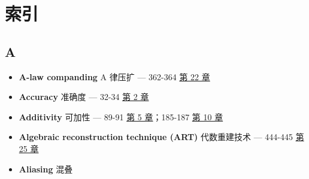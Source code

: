 
\chapter{索引}\label{ch-35}

\section{A}

\begin{itemize}
\tightlist
\item
  \textbf{A-law companding} A 律压扩 --- 362-364 
  \hyperref[ch-22]{第 22 章}
\item
  \textbf{Accuracy} 准确度 --- 32-34  \hyperref[ch-02]{第 2
  章}
\item
  \textbf{Additivity} 可加性 --- 89-91  \hyperref[ch-05]{第 5
  章}；185-187  \hyperref[ch-10]{第 10 章}
\item
  \textbf{Algebraic reconstruction technique (ART)} 代数重建技术 ---
  444-445  \hyperref[ch-25]{第 25 章}
\item
  \textbf{Aliasing} 混叠


\end{itemize}
